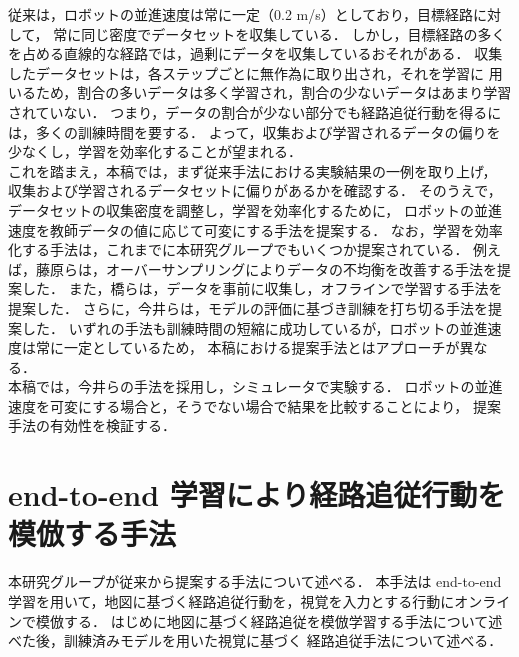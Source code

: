 \documentclass{jarticle}
\begin{document}
従来は，ロボットの並進速度は常に一定（0.2 m/s）としており，目標経路に対して，
常に同じ密度でデータセットを収集している．
しかし，目標経路の多くを占める直線的な経路では，過剰にデータを収集しているおそれがある．
収集したデータセットは，各ステップごとに無作為に取り出され，それを学習に
用いるため，割合の多いデータは多く学習され，割合の少ないデータはあまり学習されていない．
つまり，データの割合が少ない部分でも経路追従行動を得るには，多くの訓練時間を要する．
よって，収集および学習されるデータの偏りを少なくし，学習を効率化することが望まれる．\\
\hspace*{1zw}これを踏まえ，本稿では，まず従来手法における実験結果の一例を取り上げ，
収集および学習されるデータセットに偏りがあるかを確認する．
そのうえで，データセットの収集密度を調整し，学習を効率化するために，
ロボットの並進速度を教師データの値に応じて可変にする手法を提案する．
なお，学習を効率化する手法は，これまでに本研究グループでもいくつか提案されている．
例えば，藤原らは，オーバーサンプリングによりデータの不均衡を改善する手法を提案した\cite{fuji}．
また，橋らは，データを事前に収集し，オフラインで学習する手法を提案した\cite{takahashi}．
さらに，今井らは，モデルの評価に基づき訓練を打ち切る手法を提案した\cite{imai2}．
いずれの手法も訓練時間の短縮に成功しているが，ロボットの並進速度は常に一定としているため，
本稿における提案手法とはアプローチが異なる．\\
\hspace*{1zw}本稿では，今井らの手法を採用し，シミュレータで実験する．
ロボットの並進速度を可変にする場合と，そうでない場合で結果を比較することにより，
提案手法の有効性を検証する．


\section{end-to-end 学習により経路追従行動を模倣する手法}
本研究グループが従来から提案する手法について述べる．
本手法は end-to-end 学習を用いて，地図に基づく経路追従行動を，視覚を入力とする行動にオンラインで模倣する．
はじめに地図に基づく経路追従を模倣学習する手法について述べた後，訓練済みモデルを用いた視覚に基づく
経路追従手法について述べる．
\end{document}
